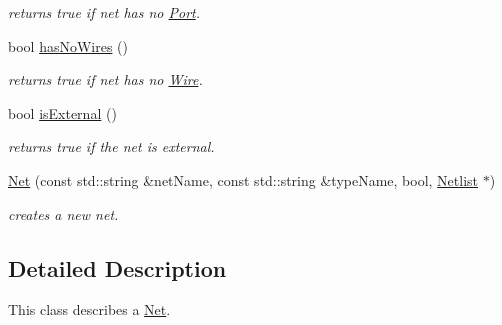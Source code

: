 \begin{DoxyCompactItemize}
\begin{DoxyCompactList}\small\item\em returns true if net has no \hyperlink{class_open_chams_1_1_port}{Port}. \end{DoxyCompactList}\item 
\hypertarget{class_open_chams_1_1_net_ac9470e72b26d4cddef3d13e69057ee54}{bool \hyperlink{class_open_chams_1_1_net_ac9470e72b26d4cddef3d13e69057ee54}{has\-No\-Wires} ()}\label{class_open_chams_1_1_net_ac9470e72b26d4cddef3d13e69057ee54}

\begin{DoxyCompactList}\small\item\em returns true if net has no \hyperlink{class_open_chams_1_1_wire}{Wire}. \end{DoxyCompactList}\item 
\hypertarget{class_open_chams_1_1_net_ab2570574db49633f58f7b64099d6852c}{bool \hyperlink{class_open_chams_1_1_net_ab2570574db49633f58f7b64099d6852c}{is\-External} ()}\label{class_open_chams_1_1_net_ab2570574db49633f58f7b64099d6852c}

\begin{DoxyCompactList}\small\item\em returns true if the net is external. \end{DoxyCompactList}\item 
\hyperlink{class_open_chams_1_1_net_a471976cf479ec4b1f521923d3a4e617d}{Net} (const std\-::string \&net\-Name, const std\-::string \&type\-Name, bool, \hyperlink{class_open_chams_1_1_netlist}{Netlist} $\ast$)
\begin{DoxyCompactList}\small\item\em creates a new net. \end{DoxyCompactList}\end{DoxyCompactItemize}


\subsection{Detailed Description}
This class describes a \hyperlink{class_open_chams_1_1_net}{Net}. 

